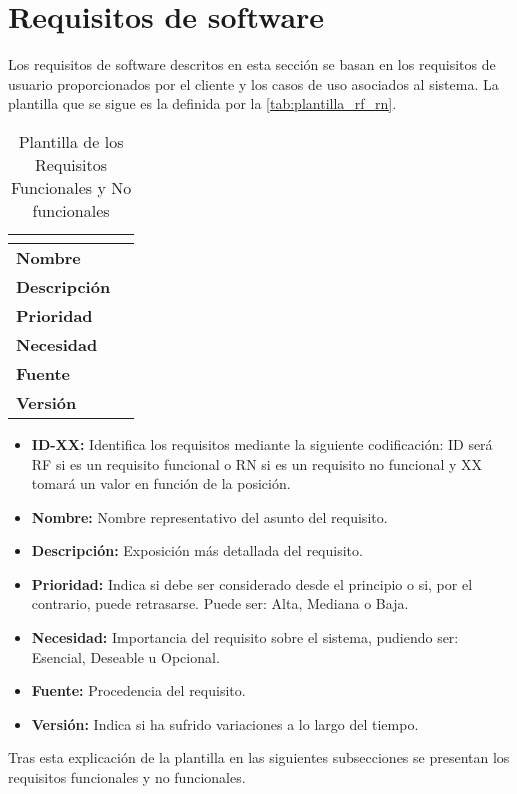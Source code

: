 \section{Requisitos de software}
Los requisitos de software descritos en esta sección se basan en los requisitos de usuario proporcionados por el cliente y los casos de uso asociados al sistema. La plantilla que se sigue es la definida por la \autoref{tab:plantilla_rf_rn}.
\begin{table}[H]
	\caption{Plantilla de los Requisitos Funcionales y No funcionales}
	\label{tab:plantilla_rf_rn}
	\begin{tabular}{|l|p{}|}
		\hline
		\multicolumn{2}{|c|}{\cellcolor[HTML]{BFBFBF}{\color[HTML]{000000} \textbf{ID-XX}}} \\ \hline
		\textbf{Nombre}      &   \\ \hline
		\textbf{Descripción} &   \\ \hline
		\textbf{Prioridad}   &   \\ \hline
		\textbf{Necesidad}   &   \\ \hline
		\textbf{Fuente}      &   \\ \hline
		\textbf{Versión}     &   \\ \hline
	\end{tabular}
\end{table}
\begin{itemize}
	\item \textbf{ID-XX:} Identifica los requisitos mediante la siguiente codificación: ID será RF si es un requisito funcional o RN si es un requisito no funcional y XX tomará un valor en función de la posición.
	\item \textbf{Nombre:} Nombre representativo del asunto del requisito.
	\item \textbf{Descripción:} Exposición más detallada del requisito.
	\item \textbf{Prioridad:} Indica si debe ser considerado desde el principio o si, por el contrario, puede retrasarse. Puede ser: Alta, Mediana o Baja.
	\item \textbf{Necesidad:} Importancia del requisito sobre el sistema, pudiendo ser: Esencial, Deseable u Opcional.
	\item \textbf{Fuente:} Procedencia del requisito.
	\item \textbf{Versión:} Indica si ha sufrido variaciones a lo largo del tiempo.
\end{itemize}

Tras esta explicación de la plantilla en las siguientes subsecciones se presentan los requisitos funcionales y no funcionales.
